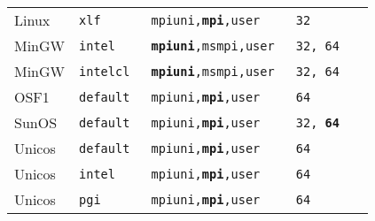 \begin{tabular}{lllll}
Linux   &\tt xlf         &\tt mpiuni,{\bf mpi},user      &\tt 32  \\
MinGW   &\tt intel       &\tt {\bf mpiuni},msmpi,user    &\tt 32, 64 \\
MinGW   &\tt intelcl     &\tt {\bf mpiuni},msmpi,user    &\tt 32, 64 \\
OSF1    &\tt default     &\tt mpiuni,{\bf mpi},user      &\tt 64  \\
SunOS   &\tt default     &\tt mpiuni,{\bf mpi},user      &\tt 32, {\bf 64} \\
Unicos  &\tt default     &\tt mpiuni,{\bf mpi},user      &\tt 64  \\
Unicos  &\tt intel       &\tt mpiuni,{\bf mpi},user      &\tt 64  \\
Unicos  &\tt pgi         &\tt mpiuni,{\bf mpi},user      &\tt 64

\end{tabular}

\vspace{1ex}

